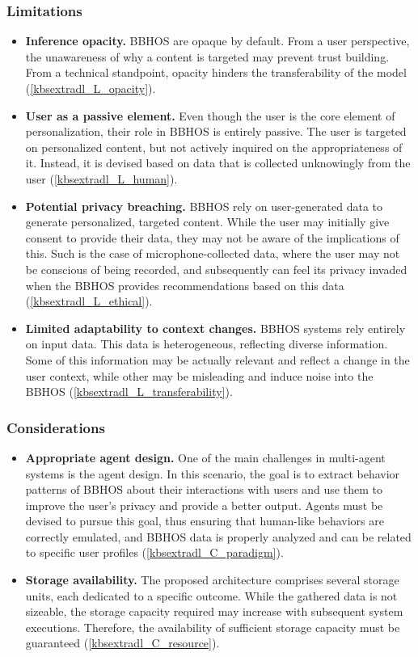 \subsubsection*{Limitations}
\begin{itemize}
    \item \textbf{Inference opacity.} BBHOS are opaque by default. From a user perspective, the unawareness of why a content is targeted may prevent trust building. From a technical standpoint, opacity hinders the transferability of the model (\ref{kbsextradl_L_opacity}).
    
    \item \textbf{User as a passive element.} Even though the user is the core element of personalization, their role in BBHOS is entirely passive. The user is targeted on personalized content, but not actively inquired on the appropriateness of it. Instead, it is devised based on data that is collected unknowingly from the user (\ref{kbsextradl_L_human}).
    
    \item \textbf{Potential privacy breaching.} BBHOS rely on user-generated data to generate personalized, targeted content. While the user may initially give consent to provide their data, they may not be aware of the implications of this. Such is the case of microphone-collected data, where the user may not be conscious of being recorded, and subsequently can feel its privacy invaded when the BBHOS provides recommendations based on this data (\ref{kbsextradl_L_ethical}).
    
    \item \textbf{Limited adaptability to context changes.} BBHOS systems rely entirely on input data. This data is heterogeneous, reflecting diverse information. Some of this information may be actually relevant and reflect a change in the user context, while other may be misleading and induce noise into the BBHOS (\ref{kbsextradl_L_transferability}). 
\end{itemize}
\subsubsection*{Considerations}
\begin{itemize}
   \item \textbf{Appropriate agent design.} One of the main challenges in multi-agent systems is the agent design. In this scenario, the goal is to extract behavior patterns of BBHOS about their interactions with users and use them to improve the user's privacy and provide a better output. Agents must be devised to pursue this goal, thus ensuring that human-like behaviors are correctly emulated, and BBHOS data is properly analyzed and can be related to specific user profiles (\ref{kbsextradl_C_paradigm}).
    
    \item \textbf{Storage availability.} The proposed architecture comprises several storage units, each dedicated to a specific outcome. While the gathered data is not sizeable, the storage capacity required may increase with subsequent system executions. Therefore, the availability of sufficient storage capacity must be guaranteed (\ref{kbsextradl_C_resource}).
\end{itemize}
